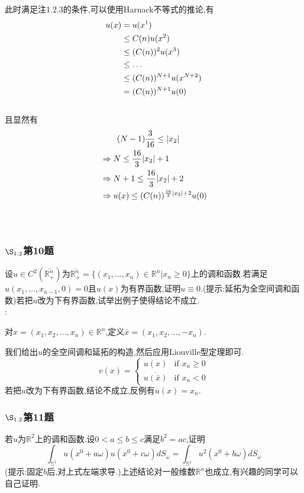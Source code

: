 \documentclass[12pt, a4paper]{ctexart}
\begin{document}
	
	此时满足注1.2.3的条件,可以使用Harnack不等式的推论,有
	\begin{align}
		u(x)&=u(x^1)\notag \\
		&\le C(n)u(x^2) \notag\\
		&\le (C(n))^2 u(x^3) \notag \\
		&\le \dots \notag \\
		&\le (C(n))^{N+1}u(x^{N+2}) \notag \\
		&= (C(n))^{N+1}u(0) \notag
	\end{align}\\
	且显然有
	\begin{align}
		&\qquad (N-1)\frac{3}{16} \le |x_2|	\notag \\
		&\Rightarrow N \le \frac{16}{3}|x_2| +1 \notag \\
		&\Rightarrow N+1 \le \frac{16}{3}|x_2| +2 \notag \\
		&\Rightarrow u(x) \le (C(n))^{\frac{16}{3}|x_2| +2}u(0) \notag 
	\end{align}\\
	{\color{red}{原题应当有误,右端还应该多一个常数.}}\\
	
	\subsubsection{$\S_{1.2}$第10题}
	\kaishu{}
	设$u \in C^2(\overline{\mathbb{R}_{+}^{n}})$为$\overline{\mathbb{R}_{+}^n}=\{(x_1,\dots,x_n)\in \mathbb{R}^n|x_n \ge 0\}$上的调和函数.若满足$u(x_1,\dots,x_{n-1},0)=0$且$u(x)$为有界函数,证明$u\equiv 0$.(提示:延拓为全空间调和函数)若把$u$改为下有界函数,试举出例子使得结论不成立.\\
	
	\songti{}
	:
	
	对$x=(x_1,x_2,\dots,x_n)\in \mathbb{R}^n$,定义$\bar{x}=(x_1,x_2,\dots,-x_n)$.	

	我们给出$u$的全空间调和延拓的构造,然后应用Liouville型定理即可.$$
	v(x)=\begin{cases}
	u(x) & \text{if } x_n \ge 0\\
	\overline{u(\bar{x})} & \text{if } x_n < 0
	\end{cases}$$
	若把$u$改为下有界函数,结论不成立,反例有$u(x)=x_n$.
	
	\subsubsection{$\S_{1.2}$第11题}
	\kaishu{}
	若$u$为$\mathbb{R}^2$上的调和函数.设$0<a\le b\le c$满足$b^2=ac$,证明$$
	\int_{\mathbb{S}^1} u(x^0+a\omega)u(x^0+c\omega)dS_{\omega}=\int_{\mathbb{S}^1}
	u^2 (x^0+b\omega)dS_{\omega}	$$
	(提示:固定$b$后,对上式左端求导.)上述结论对一般维数$\mathbb{R}^n$也成立,有兴趣的同学可以自己证明.\\
	
\end{document}

